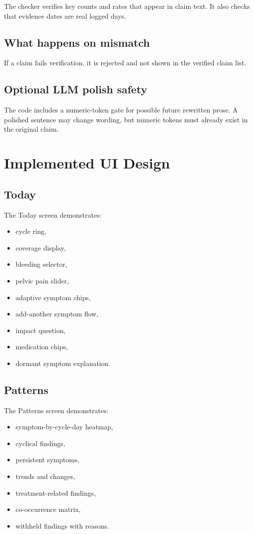 \documentclass[11pt,a4paper]{article}
\begin{document}
The checker verifies key counts and rates that appear in claim text. It also checks that evidence dates are real logged days.

\subsection{What happens on mismatch}

If a claim fails verification, it is rejected and not shown in the verified claim list.

\subsection{Optional LLM polish safety}

The code includes a numeric-token gate for possible future rewritten prose. A polished sentence may change wording, but numeric tokens must already exist in the original claim.

\section{Implemented UI Design}

\subsection{Today}

The Today screen demonstrates:

\begin{itemize}
  \item cycle ring,
  \item coverage display,
  \item bleeding selector,
  \item pelvic pain slider,
  \item adaptive symptom chips,
  \item add-another symptom flow,
  \item impact question,
  \item medication chips,
  \item dormant symptom explanation.
\end{itemize}

\subsection{Patterns}

The Patterns screen demonstrates:

\begin{itemize}
  \item symptom-by-cycle-day heatmap,
  \item cyclical findings,
  \item persistent symptoms,
  \item trends and changes,
  \item treatment-related findings,
  \item co-occurrence matrix,
  \item withheld findings with reasons.
\end{itemize}
\end{document}
